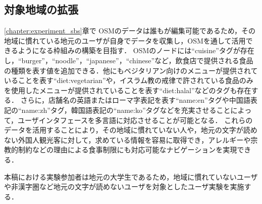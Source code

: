   \subsection{対象地域の拡張}
    \ref{chapter:experiment_sbs}章で
    OSMのデータは誰もが編集可能であるため，その地域に慣れている地元のユーザが自身でデータを収集し，OSMを通して活用できるようになる枠組みの構築を目指す．
    OSMのノードには``cuisine''タグが存在し，``burger''，``noodle''，``japanese''，``chinese''など，飲食店で提供される食品の種類を表す値を追加できる．他にもベジタリアン向けのメニューが提供されていることを表す``diet:vegetarian''や，イスラム教の戒律で許されている食品のみを使用したメニューが提供されていることを表す``diet:halal''などのタグも存在する．
    さらに，店舗名の英語またはローマ字表記を表す``name:en''タグや中国語表記の``name:zh''タグ，韓国語表記の``name:ko''タグなどを充実させることによって，ユーザインタフェースを多言語に対応させることが可能となる．
    これらのデータを活用することにより，その地域に慣れていない人や，地元の文字が読めない外国人観光客に対して，求めている情報を容易に取得でき，アレルギーや宗教的制約などの理由による食事制限にも対応可能なナビゲーションを実現できる．
    
    本稿における実験参加者は地元の大学生であるため，地域に慣れていないユーザや非漢字圏など地元の文字が読めないユーザを対象としたユーザ実験を実施する．
